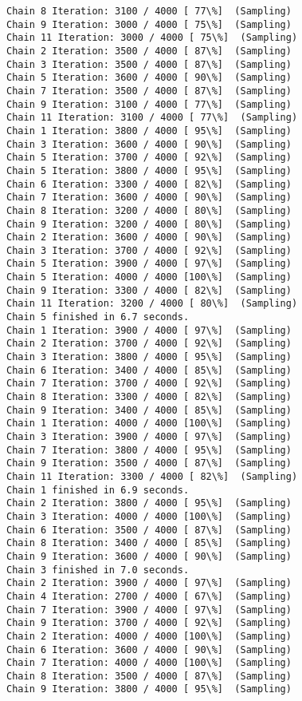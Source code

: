 \documentclass[11pt]{article}
\begin{document}
\begin{Verbatim}[commandchars=\\\{\}]
Chain 8 Iteration: 3100 / 4000 [ 77\%]  (Sampling)
Chain 9 Iteration: 3000 / 4000 [ 75\%]  (Sampling)
Chain 11 Iteration: 3000 / 4000 [ 75\%]  (Sampling)
Chain 2 Iteration: 3500 / 4000 [ 87\%]  (Sampling)
Chain 3 Iteration: 3500 / 4000 [ 87\%]  (Sampling)
Chain 5 Iteration: 3600 / 4000 [ 90\%]  (Sampling)
Chain 7 Iteration: 3500 / 4000 [ 87\%]  (Sampling)
Chain 9 Iteration: 3100 / 4000 [ 77\%]  (Sampling)
Chain 11 Iteration: 3100 / 4000 [ 77\%]  (Sampling)
Chain 1 Iteration: 3800 / 4000 [ 95\%]  (Sampling)
Chain 3 Iteration: 3600 / 4000 [ 90\%]  (Sampling)
Chain 5 Iteration: 3700 / 4000 [ 92\%]  (Sampling)
Chain 5 Iteration: 3800 / 4000 [ 95\%]  (Sampling)
Chain 6 Iteration: 3300 / 4000 [ 82\%]  (Sampling)
Chain 7 Iteration: 3600 / 4000 [ 90\%]  (Sampling)
Chain 8 Iteration: 3200 / 4000 [ 80\%]  (Sampling)
Chain 9 Iteration: 3200 / 4000 [ 80\%]  (Sampling)
Chain 2 Iteration: 3600 / 4000 [ 90\%]  (Sampling)
Chain 3 Iteration: 3700 / 4000 [ 92\%]  (Sampling)
Chain 5 Iteration: 3900 / 4000 [ 97\%]  (Sampling)
Chain 5 Iteration: 4000 / 4000 [100\%]  (Sampling)
Chain 9 Iteration: 3300 / 4000 [ 82\%]  (Sampling)
Chain 11 Iteration: 3200 / 4000 [ 80\%]  (Sampling)
Chain 5 finished in 6.7 seconds.
Chain 1 Iteration: 3900 / 4000 [ 97\%]  (Sampling)
Chain 2 Iteration: 3700 / 4000 [ 92\%]  (Sampling)
Chain 3 Iteration: 3800 / 4000 [ 95\%]  (Sampling)
Chain 6 Iteration: 3400 / 4000 [ 85\%]  (Sampling)
Chain 7 Iteration: 3700 / 4000 [ 92\%]  (Sampling)
Chain 8 Iteration: 3300 / 4000 [ 82\%]  (Sampling)
Chain 9 Iteration: 3400 / 4000 [ 85\%]  (Sampling)
Chain 1 Iteration: 4000 / 4000 [100\%]  (Sampling)
Chain 3 Iteration: 3900 / 4000 [ 97\%]  (Sampling)
Chain 7 Iteration: 3800 / 4000 [ 95\%]  (Sampling)
Chain 9 Iteration: 3500 / 4000 [ 87\%]  (Sampling)
Chain 11 Iteration: 3300 / 4000 [ 82\%]  (Sampling)
Chain 1 finished in 6.9 seconds.
Chain 2 Iteration: 3800 / 4000 [ 95\%]  (Sampling)
Chain 3 Iteration: 4000 / 4000 [100\%]  (Sampling)
Chain 6 Iteration: 3500 / 4000 [ 87\%]  (Sampling)
Chain 8 Iteration: 3400 / 4000 [ 85\%]  (Sampling)
Chain 9 Iteration: 3600 / 4000 [ 90\%]  (Sampling)
Chain 3 finished in 7.0 seconds.
Chain 2 Iteration: 3900 / 4000 [ 97\%]  (Sampling)
Chain 4 Iteration: 2700 / 4000 [ 67\%]  (Sampling)
Chain 7 Iteration: 3900 / 4000 [ 97\%]  (Sampling)
Chain 9 Iteration: 3700 / 4000 [ 92\%]  (Sampling)
Chain 2 Iteration: 4000 / 4000 [100\%]  (Sampling)
Chain 6 Iteration: 3600 / 4000 [ 90\%]  (Sampling)
Chain 7 Iteration: 4000 / 4000 [100\%]  (Sampling)
Chain 8 Iteration: 3500 / 4000 [ 87\%]  (Sampling)
Chain 9 Iteration: 3800 / 4000 [ 95\%]  (Sampling)

\end{Verbatim}
\end{document}

